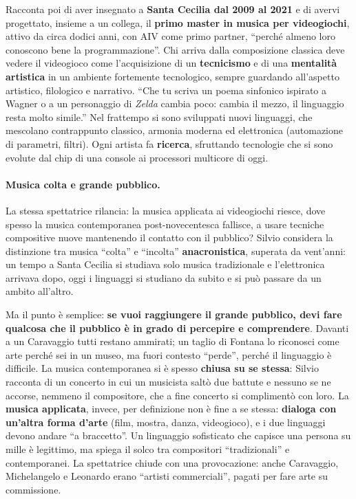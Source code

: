 Racconta poi di aver insegnato a \textbf{Santa Cecilia dal 2009 al 2021} e di avervi
progettato, insieme a un collega, il \textbf{primo master in musica per
videogiochi}, attivo da circa dodici anni, con AIV come primo partner, ``perché
almeno loro conoscono bene la programmazione''. Chi arriva dalla composizione
classica deve vedere il videogioco come l'acquisizione di un \textbf{tecnicismo} e
di una \textbf{mentalità artistica} in un ambiente fortemente tecnologico, sempre
guardando all'aspetto artistico, filologico e narrativo. ``Che tu scriva un poema
sinfonico ispirato a Wagner o a un personaggio di \emph{Zelda} cambia poco: cambia
il mezzo, il linguaggio resta molto simile.'' Nel frattempo si sono sviluppati
nuovi linguaggi, che mescolano contrappunto classico, armonia moderna ed
elettronica (automazione di parametri, filtri). Ogni artista fa \textbf{ricerca},
sfruttando tecnologie che si sono evolute dal chip di una console ai processori
multicore di oggi.

\paragraph{Musica colta e grande pubblico.} La stessa spettatrice rilancia: la
musica applicata ai videogiochi riesce, dove spesso la musica contemporanea
post-novecentesca fallisce, a usare tecniche compositive nuove mantenendo il
contatto con il pubblico? Silvio considera la distinzione tra musica
``colta'' e ``incolta'' \textbf{anacronistica}, superata da vent'anni: un tempo a
Santa Cecilia si studiava solo musica tradizionale e l'elettronica arrivava dopo,
oggi i linguaggi si studiano da subito e si può passare da un ambito all'altro.

Ma il punto è semplice: \textbf{se vuoi raggiungere il grande pubblico, devi fare
qualcosa che il pubblico è in grado di percepire e comprendere}. Davanti a un
Caravaggio tutti restano ammirati; un taglio di Fontana lo riconosci come arte
perché sei in un museo, ma fuori contesto ``perde'', perché il linguaggio è
difficile. La musica contemporanea si è spesso \textbf{chiusa su se stessa}:
Silvio racconta di un concerto in cui un musicista saltò due battute e nessuno se
ne accorse, nemmeno il compositore, che a fine concerto si complimentò con loro.
La \textbf{musica applicata}, invece, per definizione non è fine a se stessa:
\textbf{dialoga con un'altra forma d'arte} (film, mostra, danza, videogioco), e i
due linguaggi devono andare ``a braccetto''. Un linguaggio sofisticato che capisce
una persona su mille è legittimo, ma spiega il solco tra compositori
``tradizionali'' e contemporanei. La spettatrice chiude con una provocazione:
anche Caravaggio, Michelangelo e Leonardo erano ``artisti commerciali'', pagati
per fare arte su commissione.

